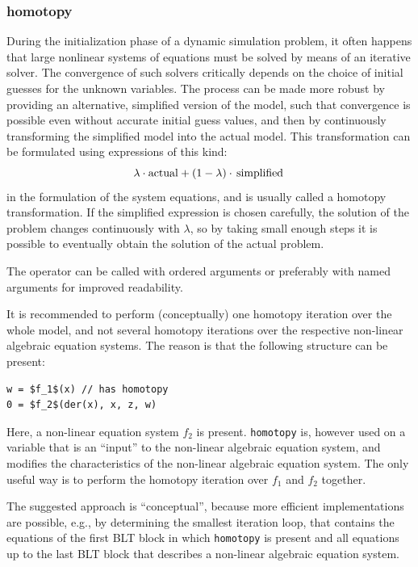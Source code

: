 \subsubsection{homotopy}\label{homotopy}

\begin{nonnormative}
During the initialization phase of a dynamic simulation problem, it often happens that large nonlinear systems of equations must be solved by means of an iterative solver.
The convergence of such solvers critically depends on the choice of initial guesses for the unknown variables.
The process can be made more robust by providing an alternative, simplified version of the model, such that convergence is possible even without accurate initial guess values, and then by continuously transforming the simplified model into the actual model.
This transformation can be formulated using expressions of this kind:
\begin{equation*}
\lambda\cdot\text{\lstinline!actual!} + (1-\lambda)\cdot\text{\lstinline!simplified!}
\end{equation*}
in the formulation of the system equations, and is usually called a homotopy transformation.
If the simplified expression is chosen carefully, the solution of the problem changes continuously with $\lambda$, so by taking small enough steps it is possible to eventually obtain the solution of the actual problem.

The operator can be called with ordered arguments or preferably with named arguments for improved readability.

It is recommended to perform (conceptually) one homotopy iteration over the whole model, and not several homotopy iterations over the respective non-linear algebraic equation systems.
The reason is that the following structure can be present:
\begin{lstlisting}[language=modelica]
w = $f_1$(x) // has homotopy
0 = $f_2$(der(x), x, z, w)
\end{lstlisting}

Here, a non-linear equation system $f_2$ is present.
\lstinline!homotopy! is, however used on a variable that is an ``input'' to the non-linear algebraic equation system, and modifies the characteristics of the non-linear algebraic equation system.
The only useful way is to perform the homotopy iteration over $f_1$ and $f_2$ together.

The suggested approach is ``conceptual'', because more efficient implementations are possible, e.g., by determining the smallest iteration loop, that contains the equations of the first BLT block in which \lstinline!homotopy! is present and all equations up to the last BLT block that describes a non-linear algebraic equation system.


\end{nonnormative}
